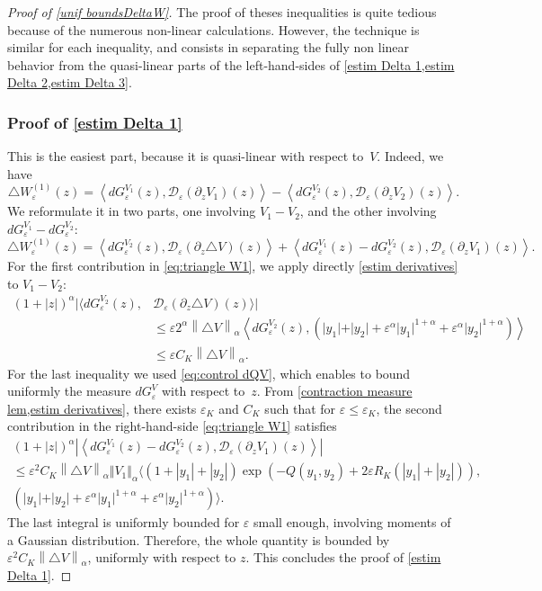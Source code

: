 \documentclass[10pt]{amsart}
\let\mathcal\mathscr
\theoremstyle{plain}
\theoremstyle{definition}
\newcommand{\D}{\mathcal{D}_\eps}
\let\eps\varepsilon
\let\ds\displaystyle
\newcommand{\abs}[1]{\left\lvert#1\right\rvert}
\newcommand{\norm}[1]{\left\lVert#1\right\rVert}
\newcommand{\QV}{G_\eps^V}
\newcommand{\dQVA}{dG_\eps^{V_1}}
\newcommand{\dQVB}{dG_\eps^{V_2}}
\newcommand{\RK}{R_K}
\begin{document}
\begin{proof}[Proof of \cref{unif boundsDeltaW}]
The proof of theses inequalities is quite tedious because of the numerous non-linear calculations. However, the technique is similar for each inequality, and consists in separating the fully non linear behavior from the quasi-linear parts of the left-hand-sides of \cref{estim Delta 1,estim Delta 2,estim Delta 3}.

\subsubsection*{Proof of \eqref{estim Delta 1}}
This is the easiest part, because it is quasi-linear with respect to~$V$. Indeed, we have
\begin{equation*}
\triangle W_\eps^{(1)}(z) = \left\langle \dQVA(z), \D(\partial_z V_1)(z)\right\rangle
- \left\langle \dQVB(z), \D(\partial_z V_2)(z) \right\rangle.
\end{equation*}
We reformulate it in two parts, one involving $V_1-V_2$, and the other involving \hbox{$\dQVA-\dQVB$}:
\begin{equation}\label{eq:triangle W1}
\triangle W_\eps^{(1)}(z)=
\left\langle \dQVB(z),\D(\partial_z \triangle V)(z) \right\rangle + \left\langle \dQVA(z)-\dQVB(z), \D(\partial_z V_1)(z) \right\rangle.
\end{equation}
For the first contribution in \eqref{eq:triangle W1}, we apply directly \cref{estim derivatives} to $V_1-V_2$:
\begin{align*}
\ds (1+\abs{z})^\alpha \bigl|\bigl\langle \dQVB(z),& \D(\partial_z \triangle V)(z) \bigr\rangle\bigr|\\
&
\leq \eps 2^\alpha \norm{ \triangle V}_\alpha \left\langle \dQVB(z), \left(\vert y_1 \vert+ \vert y_2 \vert + \eps^\alpha \vert y_1 \vert^{1+\alpha} + \eps^\alpha\vert y_2 \vert^{1+\alpha} \right) \right\rangle\\
& \leq \eps C_K \norm{\triangle V}_\alpha.
\end{align*}
For the last inequality we used \cref{eq:control dQV}, which enables to bound uniformly the measure $d\QV$ with respect to~$z$.
From \cref{contraction measure lem,estim derivatives}, there exists $\eps_K$ and $C_K$ such that for $\eps\leq \eps_K$, the second contribution in the right-hand-side \eqref{eq:triangle W1} satisfies
\begin{multline}\label{eq:truc}
\ds (1+\abs{z})^\alpha \abs{ \left\langle \dQVA(z)-\dQVB(z), \D(\partial_z V_1)(z) \right\rangle } \\
\leq \eps^2 C_K \norm{\triangle V}_\alpha \Vert V_1 \Vert_\alpha \Big\langle (1+\abs{y_1} + \abs{y_2}) \exp (-Q(y_1,y_2) + 2\eps \RK(\abs{y_1}+\abs{y_2})),
\\
\left(\vert y_1 \vert+ \vert y_2 \vert + \eps^\alpha\vert y_1 \vert^{1+\alpha} + \eps^\alpha\vert y_2 \vert^{1+\alpha} \right) \Big\rangle.
\end{multline}
The last integral is uniformly bounded for $\eps$ small enough, involving moments of a Gaussian distribution. Therefore, the whole quantity is bounded by $\eps^2 C_K \norm{\triangle V}_\alpha$, uniformly with respect to $z$. This concludes the proof of \cref{estim Delta 1}.


\end{proof}
\end{document}
